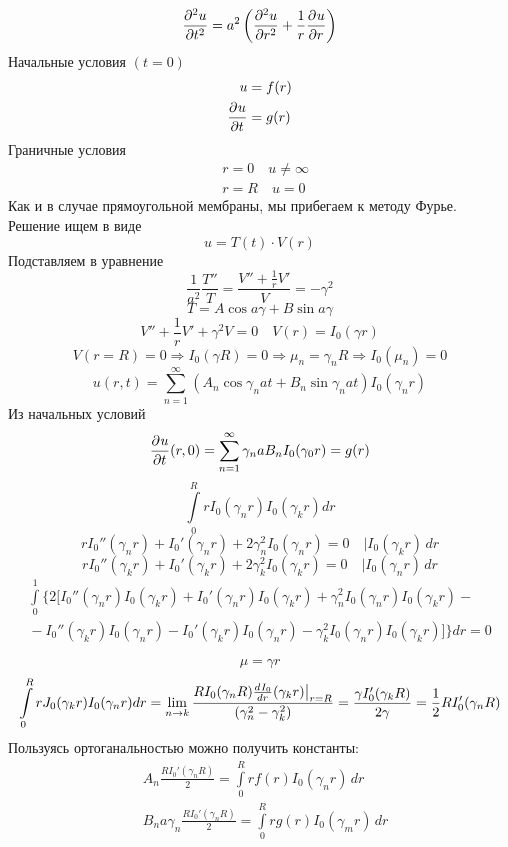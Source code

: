 		\[
			\frac{\partial^{2}u}{\partial t^{2}} = a^2 \left(\frac{\partial^{2}u}{\partial r^{2}} + \frac{1}{r} \frac{\partial^{}u}{\partial r^{}}\right)
		\]
		Начальные условия $(t = 0)$
		\begin{align*}
			u&=f(r)\\
			\frac{\partial^{}u}{\partial t^{}} &= g(r)
		\end{align*}
		Граничные условия
		\begin{align*}
			&r=0 \quad u \neq \infty\\
			&r=R \quad u=0
		\end{align*}
		Как и в случае прямоугольной мембраны, мы прибегаем к методу Фурье. Решение ищем в виде
		\[
			u= T(t) \cdot V(r)
		\]
		Подставляем в уравнение
		\[
			\frac{1}{a^2} \frac{T''}{T} = \frac{V'' + \frac{1}{r} V'}{V} = - \gamma^2
		\]
		\[
			T = A \cos a\gamma + B \sin a \gamma
		\]
		\[
			V'' + \frac{1}{r} V' + \gamma^2 V = 0 \quad V(r) = I_0 (\gamma r)
		\]
		\[
			V(r = R) = 0 \Rightarrow  I_0 (\gamma R) = 0\Rightarrow   \mu_n = \gamma_n R\Rightarrow  I_0(\mu_n) = 0
		\]
		\[
			u(r, t) = \sum\limits_{n = 1}^{\infty} (A_{n} \cos \gamma_n a t + B_n \sin \gamma_n a t) I_0 (\gamma_n r)
		\]
		Из начальных условий
		\[
			\frac{\partial^{}u}{\partial t^{}}(r, 0) = \sum\limits_{n = 1}^{\infty} \gamma_n a B_n I_0 (\gamma_0 r) = g(r)
		\]
		\[
			\int\limits_0^R r I_0 (\gamma_n r) I_0 (\gamma_k r) dr
		\]
		\[
			r I_0''(\gamma_n r) + I_0'(\gamma_n r) + 2 \gamma_n^2 I_0 (\gamma_n r) = 0 \quad | I_0 (\gamma_k r)\, dr
		\]
		\[
			r I_0''(\gamma_k r) + I_0'(\gamma_k r) + 2 \gamma_k^2 I_0 (\gamma_k r) = 0 \quad | I_0 (\gamma_n r)\, dr
		\]
		\begin{multline*}
			\int\limits_0^1 \{ 2 [I_0''(\gamma_n r) I_0 (\gamma_k r) + I_0' (\gamma_n r) I_0 (\gamma_k r) + \gamma_n^2 I_0 (\gamma_n r) I_0 (\gamma_k r) -\\{}- I_0'' (\gamma_k r) I_0 (\gamma_n r) - I_0' (\gamma_k r) I_0 (\gamma_n r) -  \gamma_k^2 I_0 (\gamma_n r) I_0 (\gamma_k r)]\} dr = 0
		\end{multline*}
	
		
	
		\[
			\mu = \gamma r
		\]
		\[
			\int\limits_0^R r J_0 (\gamma_k r) I_0 (\gamma_n r) dr = \lim\limits_{n \rightarrow k} \frac{R I_0 (\gamma_n R) \frac{d^{}I_0}{dr^{}} (\gamma_k r ) \bigl|_{r = R}}{(\gamma_n^2 - \gamma_k^2)} = \frac{\gamma I_0' (\gamma_k R)}{2 \gamma} = \frac{1}{2} R I_0'(\gamma_n R)
		\]
		Пользуясь ортоганальностью можно получить константы:\\
		\begin{align*}
			&A_n \frac{R I_0' (\gamma_n R)}{2} = \int\limits_0^R r f(r) I_0 (\gamma_n r)\, dr\\
			&B_n a \gamma_n \frac{R I_0' (\gamma_n R)}{2} = \int\limits_0^R r g(r) I_0 (\gamma_m r)\, dr
		\end{align*}
